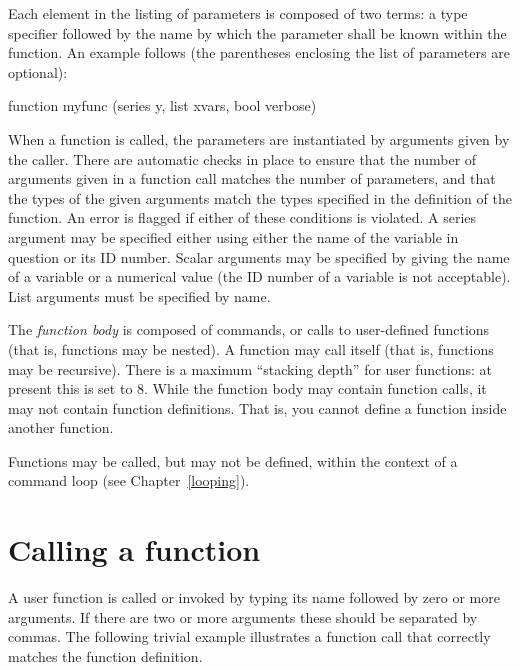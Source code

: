 Each element in the listing of parameters is composed of two terms: a
type specifier followed by the name by which the parameter shall be
known within the function.  An example follows (the parentheses
enclosing the list of parameters are optional):
    
\begin{code}
      function myfunc (series y, list xvars, bool verbose)
\end{code}

When a function is called, the parameters are instantiated by
arguments given by the caller.  There are automatic checks in place to
ensure that the number of arguments given in a function call matches
the number of parameters, and that the types of the given arguments
match the types specified in the definition of the function.  An error
is flagged if either of these conditions is violated.  A series
argument may be specified either using either the name of the variable
in question or its ID number.  Scalar arguments may be specified by
giving the name of a variable or a numerical value (the ID number of a
variable is not acceptable).  List arguments must be specified by
name.
    
The \textsl{function body} is composed of  commands, or
calls to user-defined functions (that is, functions may be nested).  A
function may call itself (that is, functions may be recursive). There
is a maximum ``stacking depth'' for user functions: at present this is
set to 8.  While the function body may contain function calls, it may
not contain function definitions.  That is, you cannot define a
function inside another function.  

Functions may be called, but may not be defined, within the context of
a command loop (see Chapter~\ref{looping}).
    

\section{Calling a function}
\label{func-call}

A user function is called or invoked by typing its name followed by
zero or more arguments.  If there are two or more arguments these
should be separated by commas.  The following trivial example
illustrates a function call that correctly matches the function
definition.
    

